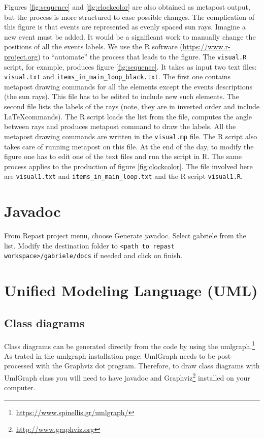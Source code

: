 \documentclass{book}
\begin{document}
Figures \ref{fig:sequence} and \ref{fig:clockcolor} are also obtained as metapost output, but the process is more structured to ease possible changes. The complication of this figure is that events are represented as evenly spaced sun rays. Imagine a new event must be added. It would be a significant work to manually change the positions of all the events labels. We use the R software (\href{https://www.r-project.org}{https://www.r-project.org}) to ``automate'' the process that leads to the figure. The \verb+visual.R+ script, for example, produces figure \ref{fig:sequence}. It takes as input two text files: \verb+visual.txt+ and \verb+items_in_main_loop_black.txt+. The first one contains metapost drawing commands for all the elements except the events descriptions (the sun rays). This file has to be edited to include new such elements. The second file lists the labels of the rays (note, they are in inverted order and include \LaTeX commands). The R script loads the list from the file, computes the angle between rays and produces metapost command to draw the labels. All the metapost drawing commands are written in the \verb+visual.mp+ file. The R script also takes care of running metapost on this file.
At the end of the day, to modify the figure one has to edit one of the text files and run the script in R. The same process applies to the production of figure \ref{fig:clockcolor}. The file involved here are \verb+visual1.txt+ and \verb+items_in_main_loop.txt+ and the R script \verb+visual1.R+.

\chapter{Javadoc}

From Repast project menu, choose Generate javadoc. Select gabriele from the list. Modify the destination folder to 
\verb+<path to repast workspace>/gabriele/docs+ if needed and click on finish.



\chapter{Unified Modeling Language (UML)}
\section{Class diagrams}

Class diagrams can be generated directly from the code by using the umlgraph.\footnote{\url{https://www.spinellis.gr/umlgraph/}} 
As trated in the umlgraph installation page:  
UmlGraph needs to be post-processed with the Graphviz dot program. Therefore, to draw class diagrams with UmlGraph class you will need to have javadoc and Graphviz\footnote{\url{http://www.graphviz.org}} installed on your computer. 
 
\end{document}
